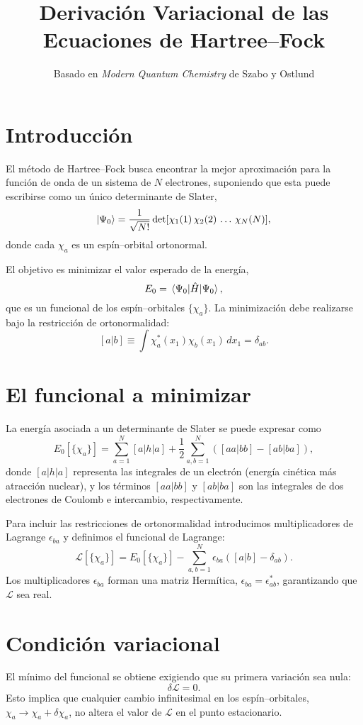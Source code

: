 \documentclass[12pt,a4paper]{article}
\title{Derivación Variacional de las Ecuaciones de Hartree--Fock}
\author{Basado en \textit{Modern Quantum Chemistry} de Szabo y Ostlund}
\date{}
\begin{document}
\maketitle

\section{Introducción}

El método de Hartree--Fock busca encontrar la mejor aproximación para la función de onda de un sistema de \( N \) electrones, suponiendo que esta puede escribirse como un único determinante de Slater,
\[
\ket{\Psi_0} = \frac{1}{\sqrt{N!}} \det[\chi_1(1)\,\chi_2(2)\,\dots\,\chi_N(N)],
\]
donde cada \(\chi_a\) es un espín–orbital ortonormal.

El objetivo es minimizar el valor esperado de la energía,
\[
E_0 = \mel{\Psi_0}{\hat{H}}{\Psi_0},
\]
que es un funcional de los espín–orbitales \(\{\chi_a\}\).  
La minimización debe realizarse bajo la restricción de ortonormalidad:
\[
[a|b] \equiv \int \chi_a^*(x_1)\chi_b(x_1)\,dx_1 = \delta_{ab}.
\]

\section{El funcional a minimizar}

La energía asociada a un determinante de Slater se puede expresar como
\[
E_0[\{\chi_a\}] = \sum_{a=1}^{N} [a|h|a] 
+ \frac{1}{2} \sum_{a,b=1}^{N} \left( [aa|bb] - [ab|ba] \right),
\]
donde \( [a|h|a] \) representa las integrales de un electrón (energía cinética más atracción nuclear), y los términos \( [aa|bb] \) y \( [ab|ba] \) son las integrales de dos electrones de Coulomb e intercambio, respectivamente.

Para incluir las restricciones de ortonormalidad introducimos multiplicadores de Lagrange \(\epsilon_{ba}\) y definimos el funcional de Lagrange:
\[
\mathcal{L}[\{\chi_a\}] = 
E_0[\{\chi_a\}] 
- \sum_{a,b=1}^{N} \epsilon_{ba} \left( [a|b] - \delta_{ab} \right).
\]
Los multiplicadores \(\epsilon_{ba}\) forman una matriz Hermítica, \(\epsilon_{ba} = \epsilon_{ab}^*\), garantizando que \(\mathcal{L}\) sea real.

\section{Condición variacional}

El mínimo del funcional se obtiene exigiendo que su primera variación sea nula:
\[
\delta \mathcal{L} = 0.
\]
Esto implica que cualquier cambio infinitesimal en los espín–orbitales,
\(\chi_a \to \chi_a + \delta\chi_a\),
no altera el valor de \(\mathcal{L}\) en el punto estacionario.
\end{document}
